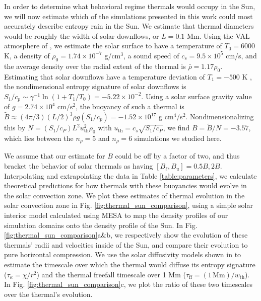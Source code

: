 \documentclass[twocolumn, amsmath, amsfonts, amssymb, trackchanges]{aastex62}
\begin{document}
In order to determine what behavioral regime thermals would occupy in the Sun, we will now estimate which of the simulations presented in this work could most accurately describe entropy rain in the Sun.
We estimate that thermal diameters would be roughly the width of solar downflows, or $L = 0.1$ Mm.
Using the VAL atmosphere of \citet{avrett&loeser2008}, we estimate the solar surface to have a temperature of $T_0 = 6000$ K, a density of $\rho_0 = 1.74 \times 10^{-7}$ g/cm$^3$, a sound speed of $c_s = 9.5 \times 10^5$ cm/s, and the average density over the radial extent of the thermal is $\bar{\rho} = 1.17\rho_0$.
Estimating that solar downflows have a temperature deviation of $T_1 = -500$ K \citep{borrero&bellotrubio2002}, the nondimensional entropy signature of solar downflows is $S_1/c_p \sim \gamma^{-1}\ln(1 + T_1/T_0) = -5.22 \times 10^{-2}$.
Using a solar surface gravity value of $g = 2.74 \times 10^4$ cm/s$^2$, the buoyancy of such a thermal is $\tilde{B} \approx (4\pi/3) (L/2)^3\bar{\rho}g (S_1/c_p) = -1.52 \times 10^{17}$ g cm$^4$/s$^2$.
Nondimensionalizing this by $N = (S_1/c_P) L^2 u_{\text{th}}^2 \rho_0$ with $u_{\text{th}} = c_s \sqrt{S_1/c_P}$, we find $B = \tilde{B}/N = -3.57$, which lies between the $n_\rho = 5$ and $n_\rho = 6$ simulations we studied here.

We assume that our estimate for $B$ could be off by a factor of two, and thus bracket the behavior of solar thermals as having $[B_\ell, B_u] = 0.5B, 2B$.
Interpolating and extrapolating the data in Table \ref{table:parameters}, we calculate theoretical predictions for how thermals with these buoyancies would evolve in the solar convection zone.
We plot these estimates of thermal evolution in the solar convection zone in Fig. \ref{fig:thermal_sun_comparison}, using a simple solar interior model calculated using MESA \citep{paxton&all2011} to map the density profiles of our simulation domains onto the density profile of the Sun.
In Fig. \ref{fig:thermal_sun_comparison}a\&b, we respectively show the evolution of these thermals' radii and velocities inside of the Sun, and compare their evolution to pure horizontal compression.
We use the solar diffusivity models shown in \citet{brown2011} to estimate the timescale over which the thermal would diffuse its entropy signature ($\tau_\kappa = \chi/r^2$) and the thermal freefall timescale over 1 Mm ($\tau_{\text{ff}} = (1\,\text{Mm})/w_{\text{th}}$).
In Fig. \ref{fig:thermal_sun_comparison}c, we plot the ratio of these two timescales over the thermal's evolution.
\end{document}
